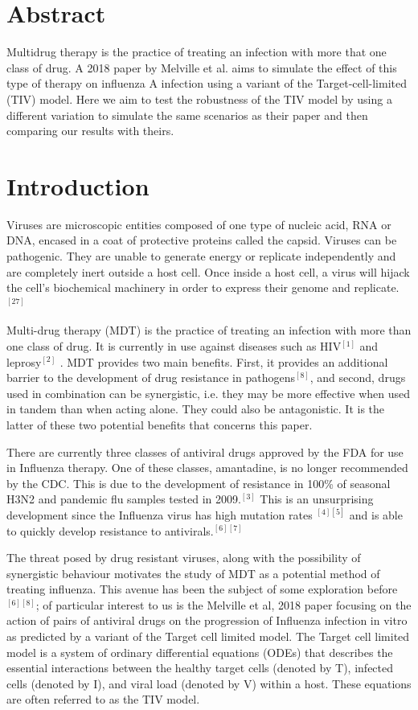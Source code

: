 \documentclass[a4paper,11pt]{article}
\begin{document}
\section*{Abstract}
Multidrug therapy is the practice of treating an infection with more that one class of drug. A 2018 paper by Melville et al. aims to simulate the effect of this type of therapy on influenza A infection using a variant of the Target-cell-limited (TIV) model. Here we aim to test the robustness of the TIV model by using a different variation to simulate the same scenarios as their paper and then comparing our results with theirs. 
\section*{Introduction}
Viruses are microscopic entities composed of one type of nucleic acid, RNA or DNA, encased in a coat of protective proteins called the capsid. Viruses can be pathogenic. They are unable to generate energy or replicate independently and are completely inert outside a host cell. Once inside a host cell, a virus will hijack the cell's biochemical machinery in order to express their genome and replicate.$^{[27]}$ 

Multi-drug therapy (MDT) is the practice of treating an infection with more than one class of drug. It is currently in use against diseases such as HIV$^{[1]}$ and leprosy$^{[2]}$ . MDT provides two main benefits. First, it provides an additional barrier to the development of drug resistance in pathogens$^{[8]}$, and second, drugs used in combination can be synergistic, i.e. they may be more effective when used in tandem than when acting alone. They could also be antagonistic. It is the latter of these two potential benefits that concerns this paper. 

There are currently three classes of antiviral drugs approved by the FDA for use in Influenza therapy. One of these classes, amantadine, is no longer recommended by the CDC. This is due to the development of resistance in 100\% of seasonal H3N2 and pandemic flu samples tested in 2009.$^{[3]}$ This is an unsurprising development since the Influenza virus has high mutation rates $^{[4][5]}$ and is able to quickly develop resistance to antivirals.$^{[6][7]}$ 

The threat posed by drug resistant viruses, along with the possibility of synergistic behaviour motivates the study of MDT as a potential method of treating influenza. This avenue has been the subject of some exploration before$^{[6][8]}$; of particular interest to us is the Melville et al, 2018 paper focusing on the action of pairs of antiviral drugs on the progression of Influenza infection in vitro as predicted by a variant of the Target cell limited model. The Target cell limited model is a system of ordinary differential equations (ODEs) that describes the essential interactions between the healthy target cells (denoted by T), infected cells (denoted by I), and viral load (denoted by V) within a host. These equations are often referred to as the TIV model.  
\end{document}
